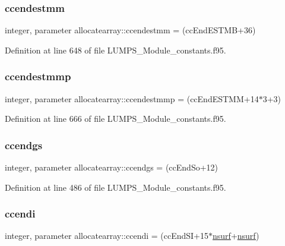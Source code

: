 \subsubsection{\texorpdfstring{ccendestmm}{ccendestmm}}
{\footnotesize\ttfamily integer, parameter allocatearray\+::ccendestmm = (cc\+End\+E\+S\+T\+MB+36)}



Definition at line 648 of file L\+U\+M\+P\+S\+\_\+\+Module\+\_\+constants.\+f95.

\mbox{\label{namespaceallocatearray_aea45a9a70b07fc8b92b8946a2b41e299}} 
\subsubsection{\texorpdfstring{ccendestmmp}{ccendestmmp}}
{\footnotesize\ttfamily integer, parameter allocatearray\+::ccendestmmp = (cc\+End\+E\+S\+T\+MM+14$\ast$3+3)}



Definition at line 666 of file L\+U\+M\+P\+S\+\_\+\+Module\+\_\+constants.\+f95.

\mbox{\label{namespaceallocatearray_a58b7fd051dfe010900cccf4da1dd09c0}} 
\subsubsection{\texorpdfstring{ccendgs}{ccendgs}}
{\footnotesize\ttfamily integer, parameter allocatearray\+::ccendgs = (cc\+End\+So+12)}



Definition at line 486 of file L\+U\+M\+P\+S\+\_\+\+Module\+\_\+constants.\+f95.

\mbox{\label{namespaceallocatearray_af9ae03fc712bb619c65cb29844048e33}} 
\subsubsection{\texorpdfstring{ccendi}{ccendi}}
{\footnotesize\ttfamily integer, parameter allocatearray\+::ccendi = (cc\+End\+SI+15$\ast$\hyperlink{namespaceallocatearray_acd22f92a06f7e9a2a91426b3dc99fdb0}{nsurf}+\hyperlink{namespaceallocatearray_acd22f92a06f7e9a2a91426b3dc99fdb0}{nsurf})}



